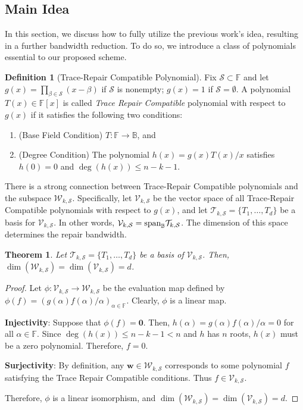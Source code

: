 \documentclass[onecolumn]{IEEEtran}
\theoremstyle{plain}
\newtheorem{theorem}{Theorem}
\theoremstyle{definition}
\newtheorem{definition}{Definition}
\newcommand{\FF}{\mathbb{F}}
\newcommand{\BB}{\mathbb{B}}
\newcommand{\cS}{\mathcal{S}}
\newcommand{\cT}{\mathcal{T}}
\newcommand{\cW}{\mathcal{W}}
\newcommand{\cV}{\mathcal{V}}
\newcommand{\vspan}{{\rm span}}
\begin{document}
\subsection{Main Idea}\label{sec:main_idea}
In this section, we discuss how to fully utilize the previous work's idea, resulting in a further bandwidth reduction. To do so, we introduce a class of polynomials essential to our proposed scheme.

\begin{definition}[Trace-Repair Compatible Polynomial]\label{def:trace-repair-compatible}
    Fix $\cS\subset\FF$ and let $g(x) = \prod_{\beta\in\cS}(x-\beta)$ if $\cS$ is nonempty; $g(x) = 1$ if $\cS = \emptyset$. A polynomial $T(x)\in\FF[x]$ is called \textit{Trace Repair Compatible} polynomial with respect to $g(x)$ if it satisfies the following two conditions:
    \begin{enumerate}
        \item (Base Field Condition) $T:\FF\to\BB$, and
        \item (Degree Condition) The polynomial $h(x) = g(x) T(x)/x$ satisfies $h(0) = 0$ and $\deg(h(x))\le n-k-1$.
    \end{enumerate}
\end{definition}
\noindent There is a strong connection between Trace-Repair Compatible polynomials and the subspace $\cW_{k,\cS}$. 
Specifically, let $\cV_{k,\cS}$ be the vector space of all Trace-Repair Compatible polynomials with respect to $g(x)$, and let $\cT_{k,\cS}=\{T_1,\ldots,T_d\}$ be a basis for $\cV_{k,\cS}$. 
In other words, $\cV_{k,\cS} = \vspan_{\BB} \cT_{k,\cS}$.
The dimension of this space determines the repair bandwidth.
\begin{theorem}\label{thm:dim_V}
    Let $\cT_{k,\cS} = \{T_1,\ldots,T_d\}$ be a basis of $\cV_{k,\cS}$. Then, $\dim(\cW_{k,\cS}) = \dim(\cV_{k,\cS}) = d$.
\end{theorem}
\begin{proof}
    Let $\phi:\cV_{k,\cS} \to \cW_{k,\cS}$ be the evaluation map defined by $\phi(f) = (g(\alpha)f(\alpha)/\alpha)_{\alpha\in \FF}$. Clearly, $\phi$ is a linear map.

    \noindent \textbf{Injectivity}: Suppose that $\phi(f) = \boldsymbol{0}$. Then, $h(\alpha) = g(\alpha)f(\alpha)/\alpha = 0$ for all $\alpha\in\FF$. Since $\deg(h(x))\le n-k-1<n$ and $h$ has $n$ roots, $h(x)$ must be a zero polynomial. Therefore, $f = 0$.
    
    \noindent \textbf{Surjectivity}: By definition, any $\boldsymbol{w}\in\cW_{k,\cS}$ corresponds to some polynomial $f$ satisfying the Trace Repair Compatible conditions. Thus $f\in\cV_{k,\cS}$.

    \noindent Therefore, $\phi$ is a linear isomorphism, and $\dim(\cW_{k,\cS}) = \dim(\cV_{k,\cS}) = d$.
\end{proof}
\end{document}
